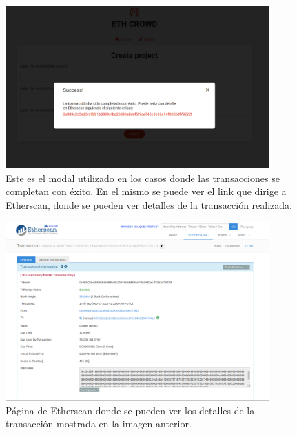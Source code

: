 \begin{figure}[H] 
\centering    
\includegraphics[width=0.9\textwidth]{modal-success}
\caption[modal-success]{Este es el modal utilizado en los casos donde las transacciones se completan con éxito. En el mismo se puede ver el link que dirige a Etherscan, donde se pueden ver detalles de la transacción realizada.}
\label{fig:modal-success}
\end{figure}

\begin{figure}[H] 
\centering    
\includegraphics[width=0.9\textwidth]{etherscan-tx}
\caption[etherscan-tx]{Página de Etherscan donde se pueden ver los detalles de la transacción mostrada en la imagen anterior.}
\label{fig:etherscan-tx}
\end{figure}

